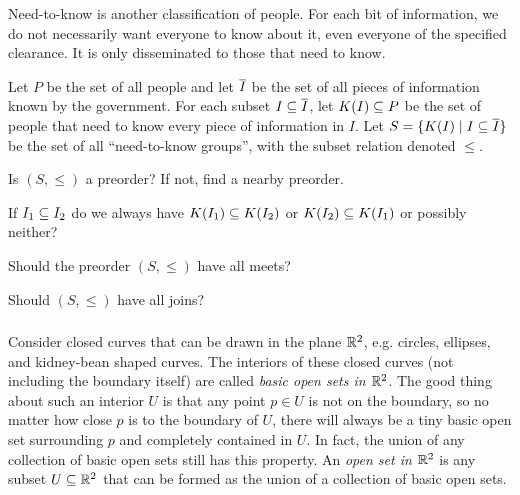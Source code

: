 \begin{blockENG}
Need-to-know is another classification of people. For each bit of information, we do not necessarily want everyone to know about it, even everyone of the specified clearance. It is only disseminated to those that need to know. 
\end{blockENG}

\begin{blockRUS}
\end{blockRUS}

\begin{exerciseENG}
Let $P$ be the set of all people and let $\ol{I}$ be the set of all pieces of information known by the government. For each subset $I\ss\ol{I}$, let $K(I)\ss P$ be the set of people that need to know every piece of information in $I$. Let $S=\{K(I)\|I\ss\ol{I}\}$ be the set of all “need-to-know groups”, with the subset relation denoted $\leq$. 

\sexc Is $(S,\leq)$ a preorder? If not, find a nearby preorder. 
\item If $I_1\ss I_2$ do we always have $K(I_1)\ss K(I_2)$ or $K(I_2)\ss K(I_1)$ or possibly neither? 
\item Should the preorder $(S,\leq)$ have all meets? 
\item Should $(S,\leq)$ have all joins?
\endsexc
\end{exerciseENG}

\begin{exerciseRUS}
\end{exerciseRUS}


\subsubsection{}

\begin{blockENG}
Consider closed curves that can be drawn in the plane $\RR^2$, e.g. circles, ellipses, and kidney-bean shaped curves. The interiors of these closed curves (not including the boundary itself) are called {\em basic open sets in $\RR^2$}. The good thing about such an interior $U$ is that any point $p\in U$ is not on the boundary, so no matter how close $p$ is to the boundary of $U$, there will always be a tiny basic open set surrounding $p$ and completely contained in $U$. In fact, the union of any collection of basic open sets still has this property. An {\em open set in $\RR^2$} is any subset $U\ss \RR^2$ that can be formed as the union of a collection of basic open sets.
\end{blockENG}

